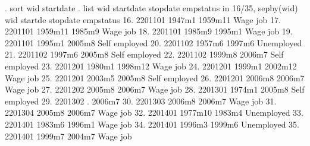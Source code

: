 . sort wid startdate
{\smallskip}
. list wid startdate stopdate empstatus  in 16/35, sepby(wid)
{\smallskip}
     {\TLC}
     {\VBAR}     wid   startd{\tytilde}e   stopdate       empstatus {\VBAR}
     {\LFTT}
 16. {\VBAR} 2201101     1947m1    1959m11        Wage job {\VBAR}
 17. {\VBAR} 2201101    1959m11     1985m9        Wage job {\VBAR}
 18. {\VBAR} 2201101     1985m9     1995m1        Wage job {\VBAR}
 19. {\VBAR} 2201101     1995m1     2005m8   Self employed {\VBAR}
     {\LFTT}
 20. {\VBAR} 2201102     1957m6     1997m6      Unemployed {\VBAR}
 21. {\VBAR} 2201102     1997m6     2005m8   Self employed {\VBAR}
 22. {\VBAR} 2201102     1999m8     2006m7   Self employed {\VBAR}
     {\LFTT}
 23. {\VBAR} 2201201     1980m1    1998m12        Wage job {\VBAR}
 24. {\VBAR} 2201201     1999m1    2002m12        Wage job {\VBAR}
 25. {\VBAR} 2201201     2003m5     2005m8   Self employed {\VBAR}
 26. {\VBAR} 2201201     2006m8     2006m7        Wage job {\VBAR}
     {\LFTT}
 27. {\VBAR} 2201202     2005m8     2006m7        Wage job {\VBAR}
     {\LFTT}
 28. {\VBAR} 2201301     1974m1     2005m8   Self employed {\VBAR}
     {\LFTT}
 29. {\VBAR} 2201302          .     2006m7                 {\VBAR}
     {\LFTT}
 30. {\VBAR} 2201303     2006m8     2006m7        Wage job {\VBAR}
     {\LFTT}
 31. {\VBAR} 2201304     2005m8     2006m7        Wage job {\VBAR}
     {\LFTT}
 32. {\VBAR} 2201401    1977m10     1983m4      Unemployed {\VBAR}
 33. {\VBAR} 2201401     1983m6     1996m1        Wage job {\VBAR}
 34. {\VBAR} 2201401     1996m3     1999m6      Unemployed {\VBAR}
 35. {\VBAR} 2201401     1999m7     2004m7        Wage job {\VBAR}
     {\BLC}
